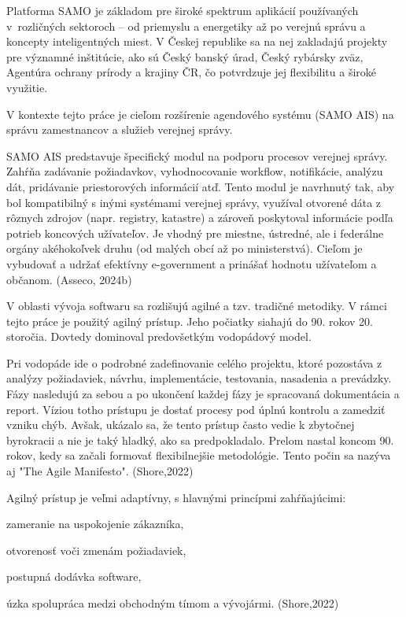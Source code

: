 Platforma SAMO je základom pre široké spektrum aplikácií používaných v~rozličných sektoroch – od priemyslu a energetiky až po verejnú správu a koncepty inteligentných miest. V Českej republike sa na nej zakladajú projekty pre významné inštitúcie, ako sú Český banský úrad, Český rybársky zväz, Agentúra ochrany prírody a krajiny ČR, čo potvrdzuje jej flexibilitu a široké využitie.


V kontexte tejto práce je cieľom rozšírenie agendového systému (SAMO AIS) na správu zamestnancov a služieb verejnej správy.

SAMO AIS predstavuje špecifický modul na podporu procesov verejnej správy. Zahŕňa zadávanie požiadavkov, vyhodnocovanie workflow, notifikácie, analýzu dát, pridávanie priestorových informácií atď. Tento modul je navrhnutý tak, aby bol kompatibilný s inými systémami verejnej správy, využíval otvorené dáta z rôznych zdrojov (napr. registry, katastre) a zároveň poskytoval informácie podľa potrieb koncových užívateľov. Je vhodný pre miestne, ústredné, ale i federálne orgány akéhokoľvek druhu (od malých obcí až po ministerstvá). Cieľom je vybudovať a udržať efektívny e-government a prinášať hodnotu užívateľom a občanom. \scr(Asseco, 2024b)


V oblasti vývoja softwaru sa rozlišujú agilné a tzv. tradičné metodiky. V rámci tejto práce je použitý agilný prístup. Jeho počiatky siahajú do 90. rokov 20. storočia. Dovtedy dominoval predovšetkým vodopádový model.

Pri vodopáde ide o podrobné zadefinovanie celého projektu, ktoré pozostáva z analýzy požiadaviek, návrhu, implementácie, testovania, nasadenia a prevádzky. Fázy nasledujú za sebou a po ukončení každej fázy je spracovaná dokumentácia a report. Víziou totho prístupu je dostať procesy pod úplnú kontrolu a zamedziť vzniku chýb. Avšak, ukázalo sa, že tento prístup často vedie k zbytočnej byrokracii a nie je taký hladký, ako sa predpokladalo. Prelom nastal koncom 90. rokov, kedy sa začali formovať flexibilnejšie metodológie. Tento počin sa nazýva aj "The Agile Manifesto". \scr(Shore,2022)

Agilný prístup je veľmi adaptívny, s hlavnými princípmi zahŕňajúcimi:

\startitemize
\item zameranie na uspokojenie zákazníka, 
\item otvorenosť voči zmenám požiadaviek,
\item postupná dodávka software,
\item úzka spolupráca medzi obchodným tímom a vývojármi. \scr(Shore,2022) 
\stopitemize

